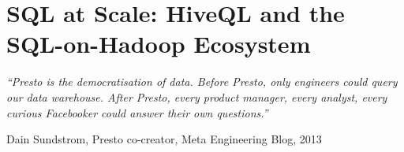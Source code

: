 
\chapter{SQL at Scale: HiveQL and the SQL-on-Hadoop Ecosystem}
\label{ch:sql-scale}

\epigraph{\textit{``Presto is the democratisation of data.
Before Presto, only engineers could query our data warehouse.
After Presto, every product manager, every analyst, every
curious Facebooker could answer their own questions.''}}{Dain Sundstrom, Presto co-creator, Meta Engineering Blog, 2013}

\vspace{4pt}

